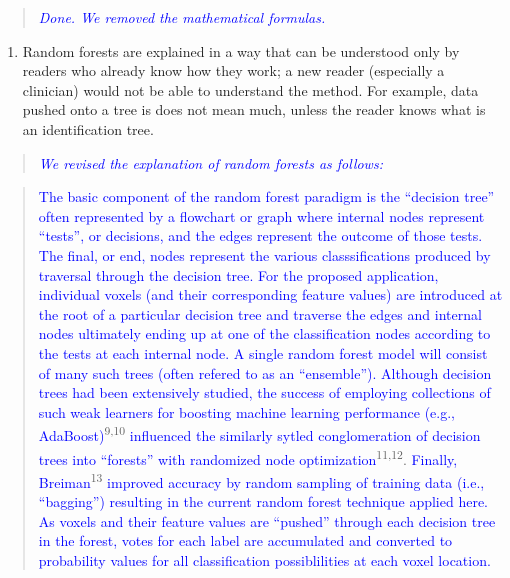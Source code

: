 \documentclass[12pt,]{article}
\providecommand{\tightlist}{%
  \setlength{\itemsep}{0pt}\setlength{\parskip}{0pt}}
\begin{document}
\begin{quote}
\emph{\textcolor{blue}{Done.  We removed the mathematical formulas.}}
\end{quote}

\begin{enumerate}
\def\labelenumi{\arabic{enumi}.}
\setcounter{enumi}{6}
\tightlist
\item
  Random forests are explained in a way that can be understood only by
  readers who already know how they work; a new reader (especially a
  clinician) would not be able to understand the method. For example,
  data pushed onto a tree is does not mean much, unless the reader knows
  what is an identification tree.
\end{enumerate}

\begin{quote}
\emph{\textcolor{blue}{
We revised the explanation of random forests as follows:}}
\end{quote}

\begin{quote}
\textcolor{blue}{The basic component of
the random forest paradigm is the ``decision tree'' often represented by a flowchart or
graph where internal nodes represent ``tests'', or decisions, and the edges represent the outcome of those tests.  The final, or end, nodes represent the various classsifications produced by traversal through the decision tree.  For the proposed application, individual
voxels (and their corresponding feature values) are introduced at the root of a particular
decision tree and traverse the edges and internal nodes ultimately ending up at one of
the classification nodes according to the tests at each internal node.  A single random
forest model will consist of many such trees (often refered to as an ``ensemble'').}
\textcolor{blue}{Although decision trees had been extensively studied, the success of employing collections of such weak learners for boosting machine learning performance
(e.g., AdaBoost)}\textsuperscript{9,10}
\textcolor{blue}{influenced the similarly sytled conglomeration of decision trees into ``forests'' with randomized node optimization}\textsuperscript{11,12}.
\textcolor{blue}{Finally, Breiman}\textsuperscript{13}
\textcolor{blue}{improved accuracy by random sampling of training data (i.e., ``bagging'') resulting
in the current random forest technique applied here.}
\textcolor{blue}{As voxels and their feature values are ``pushed'' through each decision tree in the forest,  votes for each label are accumulated and converted to probability values for all classification possiblilities at
each voxel location.}
\end{quote}
\end{document}
